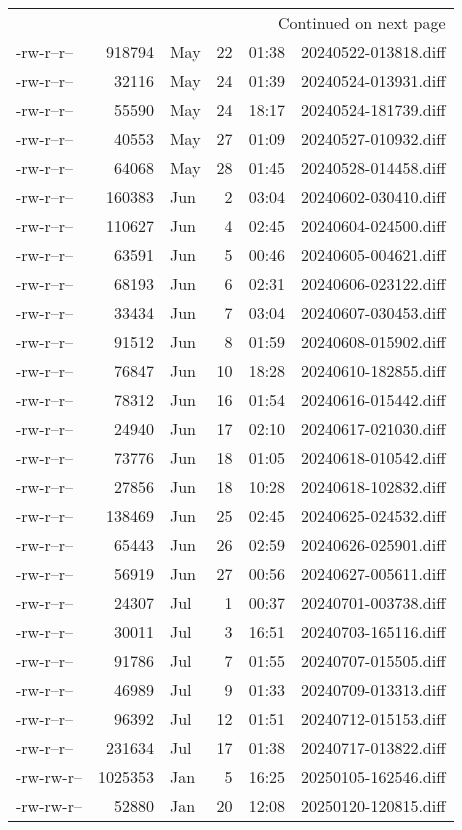 \documentclass[a4paper]{article}
\begin{document}
\begin{longtable}{lrlrrl}
\hline
\endhead
\hline\multicolumn{6}{r}{Continued on next page} \\
\endfoot
\endlastfoot
\hline
-rw-r--r-- & 918794 & May & 22 & 01:38 & 20240522-013818.diff\\[0pt]
-rw-r--r-- & 32116 & May & 24 & 01:39 & 20240524-013931.diff\\[0pt]
-rw-r--r-- & 55590 & May & 24 & 18:17 & 20240524-181739.diff\\[0pt]
-rw-r--r-- & 40553 & May & 27 & 01:09 & 20240527-010932.diff\\[0pt]
-rw-r--r-- & 64068 & May & 28 & 01:45 & 20240528-014458.diff\\[0pt]
-rw-r--r-- & 160383 & Jun & 2 & 03:04 & 20240602-030410.diff\\[0pt]
-rw-r--r-- & 110627 & Jun & 4 & 02:45 & 20240604-024500.diff\\[0pt]
-rw-r--r-- & 63591 & Jun & 5 & 00:46 & 20240605-004621.diff\\[0pt]
-rw-r--r-- & 68193 & Jun & 6 & 02:31 & 20240606-023122.diff\\[0pt]
-rw-r--r-- & 33434 & Jun & 7 & 03:04 & 20240607-030453.diff\\[0pt]
-rw-r--r-- & 91512 & Jun & 8 & 01:59 & 20240608-015902.diff\\[0pt]
-rw-r--r-- & 76847 & Jun & 10 & 18:28 & 20240610-182855.diff\\[0pt]
-rw-r--r-- & 78312 & Jun & 16 & 01:54 & 20240616-015442.diff\\[0pt]
-rw-r--r-- & 24940 & Jun & 17 & 02:10 & 20240617-021030.diff\\[0pt]
-rw-r--r-- & 73776 & Jun & 18 & 01:05 & 20240618-010542.diff\\[0pt]
-rw-r--r-- & 27856 & Jun & 18 & 10:28 & 20240618-102832.diff\\[0pt]
-rw-r--r-- & 138469 & Jun & 25 & 02:45 & 20240625-024532.diff\\[0pt]
-rw-r--r-- & 65443 & Jun & 26 & 02:59 & 20240626-025901.diff\\[0pt]
-rw-r--r-- & 56919 & Jun & 27 & 00:56 & 20240627-005611.diff\\[0pt]
-rw-r--r-- & 24307 & Jul & 1 & 00:37 & 20240701-003738.diff\\[0pt]
-rw-r--r-- & 30011 & Jul & 3 & 16:51 & 20240703-165116.diff\\[0pt]
-rw-r--r-- & 91786 & Jul & 7 & 01:55 & 20240707-015505.diff\\[0pt]
-rw-r--r-- & 46989 & Jul & 9 & 01:33 & 20240709-013313.diff\\[0pt]
-rw-r--r-- & 96392 & Jul & 12 & 01:51 & 20240712-015153.diff\\[0pt]
-rw-r--r-- & 231634 & Jul & 17 & 01:38 & 20240717-013822.diff\\[0pt]
-rw-rw-r-- & 1025353 & Jan & 5 & 16:25 & 20250105-162546.diff\\[0pt]
-rw-rw-r-- & 52880 & Jan & 20 & 12:08 & 20250120-120815.diff\\[0pt]
\end{longtable}
\rmfamily
\end{document}
